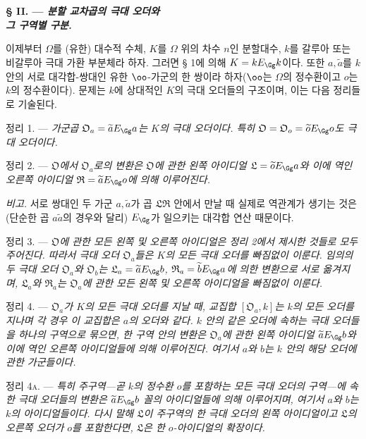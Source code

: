 
\begin{center}
\textbf{§ II. --- \emph{분할 교차곱의 극대 오더와\\
그 구역별 구분.}}
\end{center}

이제부터 $\Omega$를 (유한) 대수적 수체, $K$를 $\Omega$ 위의 차수 $n$인 분할대수, $k$를 갈루아 또는 비갈루아 극대 가환 부분체라 하자. 그러면 § 1에 의해 $K=kE_\Gg k$이다. 또한 $a,\widetilde a$를 $k$ 안의 서로 대각합-쌍대인 유한 $\oo$-가군의 한 쌍이라 하자($\oo$는 $\Omega$의 정수환이고 $o$는 $k$의 정수환이다). 문제는 $k$에 상대적인 $K$의 극대 오더들의 구조이며, 이는 다음 정리들로 기술된다.

\medskip
\noindent\textsc{정리 1. ---} \emph{가군곱 $\mathfrak O_a=\widetilde aE_\Gg a$는 $K$의 극대 오더이다. 특히 $\mathfrak O=\mathfrak O_o=\widetilde oE_\Gg o$도 극대 오더이다.}

\medskip
\noindent\textsc{정리 2. ---} \emph{$\mathfrak O$에서 $\mathfrak O_a$로의 변환은 $\mathfrak O$에 관한 왼쪽 아이디얼 $\mathfrak L=\widetilde oE_\Gg a$와 이에 역인 오른쪽 아이디얼 $\mathfrak R=\widetilde aE_\Gg o$에 의해 이루어진다.}

\emph{비고.} 서로 쌍대인 두 가군 $a,\widetilde a$가 곱 $\mathfrak L\mathfrak R$ 안에서 만날 때 실제로 역관계가 생기는 것은 (단순한 곱 $a\widetilde a$의 경우와 달리) $E_\Gg$가 일으키는 대각합 연산 때문이다.

\medskip
\noindent\textsc{정리 3. ---} \emph{$\mathfrak O$에 관한 모든 왼쪽 및 오른쪽 아이디얼은 정리 2에서 제시한 것들로 모두 주어진다. 따라서 극대 오더 $\mathfrak O_a$들은 $K$의 모든 극대 오더를 빠짐없이 이룬다. 임의의 두 극대 오더 $\mathfrak O_a$와 $\mathfrak O_b$는 $\mathfrak L_a=\widetilde aE_\Gg b$, $\mathfrak R_a=\widetilde bE_\Gg a$에 의한 변환으로 서로 옮겨지며, $\mathfrak L_a$와 $\mathfrak R_a$는 $\mathfrak O_a$에 관한 모든 왼쪽 및 오른쪽 아이디얼을 빠짐없이 이룬다.}

\medskip
\noindent\textsc{정리 4. ---} \emph{$\mathfrak O_a$가 $K$의 모든 극대 오더를 지날 때, 교집합 $[\mathfrak O_a,k]$는 $k$의 모든 오더를 지나며 각 경우 이 교집합은 $a$의 오더와 같다. $k$ 안의 같은 오더에 속하는 극대 오더들을 하나의 구역으로 묶으면, 한 구역 안의 변환은 $\mathfrak O_a$에 관한 왼쪽 아이디얼 $\widetilde aE_\Gg b$와 이에 역인 오른쪽 아이디얼들에 의해 이루어진다. 여기서 $a$와 $b$는 $k$ 안의 해당 오더에 관한 가군들이다.}

\medskip
\noindent\textsc{정리 4a. ---} \emph{특히 주구역---곧 $k$의 정수환 $o$를 포함하는 모든 극대 오더의 구역---에 속한 극대 오더들의 변환은 $\widetilde aE_\Gg b$ 꼴의 아이디얼들에 의해 이루어지며, 여기서 $a$와 $b$는 $k$의 아이디얼들이다. 다시 말해 $\mathfrak L$이 주구역의 한 극대 오더의 왼쪽 아이디얼이고 $\mathfrak L$의 오른쪽 오더가 $o$를 포함한다면, $\mathfrak L$은 한 $o$-아이디얼의 확장이다.}
